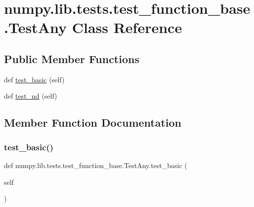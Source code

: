 \hypertarget{classnumpy_1_1lib_1_1tests_1_1test__function__base_1_1TestAny}{}\section{numpy.\+lib.\+tests.\+test\+\_\+function\+\_\+base.\+Test\+Any Class Reference}
\label{classnumpy_1_1lib_1_1tests_1_1test__function__base_1_1TestAny}
\subsection*{Public Member Functions}
\begin{DoxyCompactItemize}
\item 
def \hyperlink{classnumpy_1_1lib_1_1tests_1_1test__function__base_1_1TestAny_a55cdfdd5311e0850d89665e8e475e836}{test\+\_\+basic} (self)
\item 
def \hyperlink{classnumpy_1_1lib_1_1tests_1_1test__function__base_1_1TestAny_ad99d0573b410b7758f1ca050794e2a5a}{test\+\_\+nd} (self)
\end{DoxyCompactItemize}


\subsection{Member Function Documentation}
\mbox{\label{classnumpy_1_1lib_1_1tests_1_1test__function__base_1_1TestAny_a55cdfdd5311e0850d89665e8e475e836}} 
\subsubsection{\texorpdfstring{test\+\_\+basic()}{test\_basic()}}
{\footnotesize\ttfamily def numpy.\+lib.\+tests.\+test\+\_\+function\+\_\+base.\+Test\+Any.\+test\+\_\+basic (\begin{DoxyParamCaption}\item[{}]{self }\end{DoxyParamCaption})}

